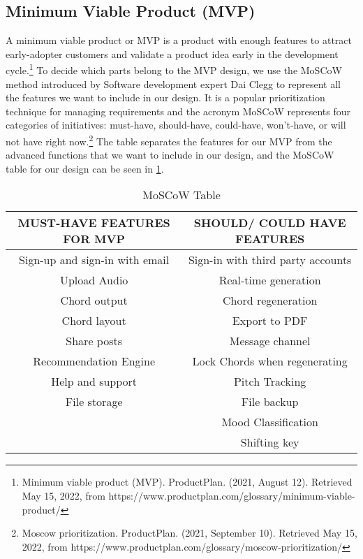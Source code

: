 \documentclass[11pt]{article}
\begin{document}
\subsection{Minimum Viable Product (MVP)}
A minimum viable product or MVP is a product with enough features to attract early-adopter customers and validate a product idea early in the development cycle.\footnote{Minimum viable product (MVP). ProductPlan. (2021, August 12). Retrieved May 15, 2022, from https://www.productplan.com/glossary/minimum-viable-product/} 
To decide which parts belong to the MVP design, we use the MoSCoW method introduced by Software development expert Dai Clegg to represent all the features we want to include in our design. It is a popular prioritization technique for managing requirements and the acronym MoSCoW represents four categories of initiatives: must-have, should-have, could-have, won’t-have, or will not have right now.\footnote{Moscow prioritization. ProductPlan. (2021, September 10). Retrieved May 15, 2022, from https://www.productplan.com/glossary/moscow-prioritization/}
The table separates the features for our MVP from the advanced functions that we want to include in our design, and the MoSCoW table for our design can be seen in \cref{moscow}.

\begin{table}[ht]
\centering
\begin{tabular}{ |c|c| } 
 \hline
\textbf{MUST-HAVE FEATURES FOR MVP} & \textbf{SHOULD/ COULD HAVE FEATURES}\\ 
 \hline
 Sign-up and sign-in with email & Sign-in with third party accounts \\ 
 \hline
 Upload Audio & Real-time generation \\ 
 \hline
 Chord output & Chord regeneration \\ 
 \hline
 Chord layout &  Export to PDF \\ 
 \hline
 Share posts & Message channel \\ 
 \hline
 Recommendation Engine &  Lock Chords when regenerating\\ 
 \hline
 Help and support &  Pitch Tracking\\ 
 \hline
 File storage& File backup \\ 
  \hline
 & Mood Classification \\ 
  \hline
 & Shifting key \\ 
 \hline
 \end{tabular}
 \caption{MoSCoW Table}
 \centering
 \label{moscow}
 \end{table}
 
\end{document}
